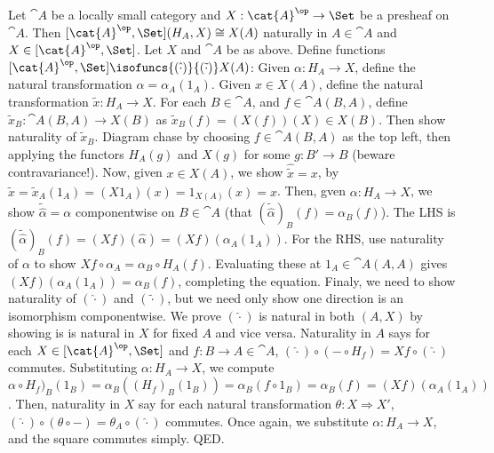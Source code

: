  Let $\cat A$ be a locally small category and $X : \cat{A}^{\op} \to \Set$ be a presheaf on $\cat A$. Then 
$[\cat{A}^{\op}, \Set](H_A, X) \cong X(A)$
naturally in $A \in \cat A$ and $X \in [\cat{A}^{\op},\Set]$.
 Let $X$ and $\cat A$ be as above.
Define functions $[\cat{A}^{\op}, \Set] \isofuncs{(\hat\cdot)}{(\tilde\cdot)} X(A)$:
Given $\alpha : H_A \to X$, define the natural transformation $\hat\alpha = \alpha_A(1_A)$.
Given $x \in X(A)$, define the natural transformation $\tilde{x} : H_A \to X$. For each $B \in \cat A$, and $f \in \cat{A}(B, A)$, define $\tilde{x}_B : \cat{A}(B, A) \to X(B)$ as $\tilde{x}_B(f) = (X(f))(X) \in X(B)$. Then show naturality of $\tilde{x}_B$. Diagram chase by choosing $f \in \cat{A}(B, A)$ as the top left, then applying the functors $H_A(g)$ and $X(g)$ for some $g : B' \to B$ (beware contravariance!).
Now, given $x \in X(A)$, we show $\hat{\tilde{x}} = x$, by $\hat{\tilde{x}} = \tilde{x}_A(1_A) = (X1_A)(x) = 1_{X(A)}(x) = x$.
Then, gven $\alpha : H_A \to X$, we show $\tilde{\hat\alpha} = \alpha$ componentwise on $B \in \cat A$ (that $(\tilde{\hat\alpha})_B(f) = \alpha_B(f)$). The LHS is $(\tilde{\hat\alpha})_B (f) = (Xf)(\hat\alpha) = (Xf)(\alpha_A(1_A))$. For the RHS, use naturality of $\alpha$ to show $Xf \circ \alpha_A = \alpha_B \circ H_A(f)$. Evaluating these at $1_A \in \cat{A}(A, A)$ gives $(Xf)(\alpha_A(1_A)) = \alpha_B(f)$, completing the equation.
Finaly, we need to show naturality of $(\hat\cdot)$ and $(\tilde\cdot)$, but we need only show one direction is an isomorphism componentwise. We prove $(\hat\cdot)$ is natural in both $(A, X)$ by showing is is natural in $X$ for fixed $A$ and vice versa.
Naturality in $A$ says for each $X \in [\cat{A}^{\op}, \Set]$ and $f : B \to A \in \cat{A}$, $(\hat\cdot) \circ (- \circ H_f) = Xf \circ (\hat\cdot)$ commutes. Substituting $\alpha : H_A \to X$, we compute $\alpha \circ H_f)_B(1_B) = \alpha_B((H_f)_B(1_B)) = \alpha_B(f \circ 1_B) = \alpha_B(f) = (Xf)(\alpha_A(1_A))$.
Then, naturality in $X$ say for each natural transformation $\theta : X \Rightarrow X'$, $(\hat\cdot) \circ (\theta \circ -) = \theta_A \circ (\hat\cdot)$ commutes. Once again, we substitute $\alpha : H_A \to X$, and the square commutes simply. QED.
